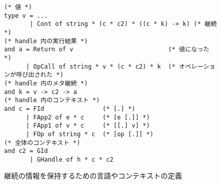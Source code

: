 \begin{figure}[t]
\begin{verbatim}
(* 値 *)
type v = ...
       | Cont of string * (c * c2) * ((c * k) -> k) (* 継続 *)
(* handle 内の実行結果 *)
and a = Return of v                          (* 値になった *)
      | OpCall of string * v * (c * c2) * k  (* オペレーションが呼び出された *)
(* handle 内のメタ継続 *)
and k = v -> c2 -> a
(* handle 内のコンテキスト *)
and c = FId                (* [.] *)
      | FApp2 of e * c     (* [e [.]] *)
      | FApp1 of v * c     (* [[.] v] *)
      | FOp of string * c  (* [op [.]] *)
(* 全体のコンテキスト *)
and c2 = GId
       | GHandle of h * c * c2
\end{verbatim}
\caption{継続の情報を保持するための言語やコンテキストの定義}
\label{figure:k_6cps}
\end{figure}



